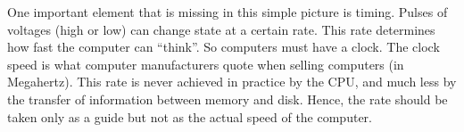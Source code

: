 \documentclass[blank]{impletter}
\begin{document}
One important element that is missing in this simple picture is
timing. Pulses of voltages (high or low) can change state at a certain
rate. This rate determines how fast the computer can ``think''. So
computers must have a clock. The clock speed is what computer
manufacturers quote when selling computers (in Megahertz). This rate
is never achieved in practice by the CPU, and much less by the
transfer of information between memory and disk. Hence, the rate
should be taken only as a guide but not as the actual speed of the
computer.

\end{document}
